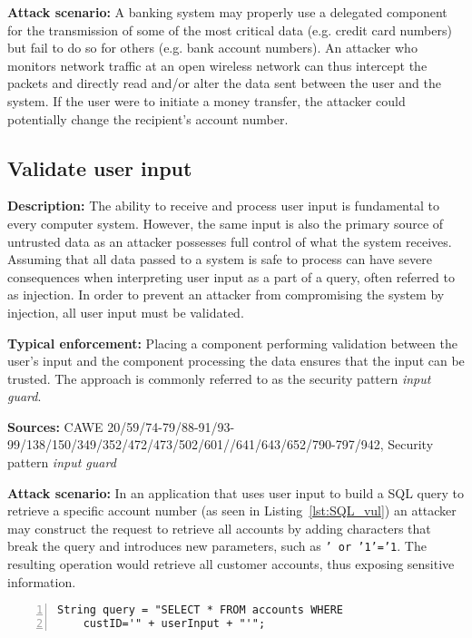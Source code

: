  \textbf{Attack scenario:}
 A banking system may properly use a delegated component for the transmission of some of the most critical data (e.g. credit card numbers) but fail to do so for others (e.g. bank account numbers). An attacker who monitors network traffic at an open wireless network can thus intercept the packets and directly read and/or alter the data sent between the user and the system. If the user were to initiate a money transfer, the attacker could potentially change the recipient's account number. 

\subsection{Validate user input} 

\textbf{Description:} 
The ability to receive and process user input is fundamental to every computer system. However, the same input is also the primary source of untrusted data as an attacker possesses full control of what the system receives. Assuming that all data passed to a system is safe to process can have severe consequences when interpreting user input as a part of a query, often referred to as injection. In order to prevent an attacker from compromising the system by injection, all user input must be validated.
 
 \textbf{Typical enforcement:} 
 Placing a component performing validation between the user's input and the component processing the data ensures that the input can be trusted. The approach is commonly referred to as the security pattern \textit{input guard}.
 
 \textbf{Sources:} CAWE 20/59/74-79/88-91/93-99/138/150/349/352/472/473/502/601/\newline/641/643/652/790-797/942, Security pattern \textit{input guard}
 
 \textbf{Attack scenario:}
 In an application that uses user input to build a SQL query to retrieve a specific account number (as seen in Listing~\ref{lst:SQL_vul}) an attacker may construct the request to retrieve all accounts by adding characters that break the query and introduces new parameters, such as \texttt{' or '1'='1}. The resulting operation would retrieve all customer accounts, thus exposing sensitive information.
 
 \begin{minipage}{\linewidth}
\begin{lstlisting}[caption={Example of a vulnerable SQL query}, captionpos=b, label=lst:SQL_vul, numbers=left, showstringspaces=false]
String query = "SELECT * FROM accounts WHERE 
    custID='" + userInput + "'";
\end{lstlisting}
\end{minipage}

